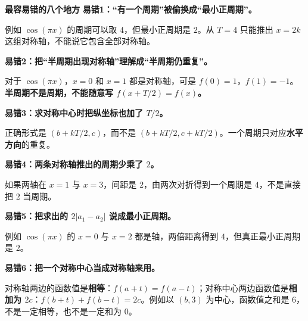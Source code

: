 \clearpage
\begin{trapbox}
\textbf{\textcolor{CTrap}{最容易错的八个地方}}
\textbf{\textcolor{CTrap}{易错1：“有一个周期”被偷换成“最小正周期”。}}



例如 $\cos(\pi x)$ 的周期可以取 $4$，但最小正周期是 $2$。从 $T=4$ 只能推出 $x=2k$ 这组对称轴，不能说它包含全部对称轴。



\end{trapbox}
\clearpage
\begin{trapbox}
\textbf{\textcolor{CTrap}{易错2：把“半周期出现对称轴”理解成“半周期仍重复”。}}



对于 $\cos(\pi x)$，$x=0$ 和 $x=1$ 都是对称轴，可是 $f(0)=1$，$f(1)=-1$。\textbf{半周期不是周期，不能随意写 $f(x+T/2)=f(x)$。}



\end{trapbox}
\clearpage
\begin{trapbox}
\textbf{\textcolor{CTrap}{易错3：求对称中心时把纵坐标也加了 $T/2$。}}



正确形式是 $(b+kT/2,c)$，而不是 $(b+kT/2,c+kT/2)$。一个周期只对应\textbf{水平方向}的重复。



\end{trapbox}
\clearpage
\begin{trapbox}
\textbf{\textcolor{CTrap}{易错4：两条对称轴推出的周期少乘了 $2$。}}



如果两轴在 $x=1$ 与 $x=3$，间距是 $2$，由两次对折得到一个周期是 $4$，不是直接把 $2$ 当周期。



\end{trapbox}
\clearpage
\begin{trapbox}
\textbf{\textcolor{CTrap}{易错5：把求出的 $2|a_1-a_2|$ 说成最小正周期。}}



例如 $\cos(\pi x)$ 的 $x=0$ 与 $x=2$ 都是轴，两倍距离得到 $4$，但真正最小正周期是 $2$。



\end{trapbox}
\clearpage
\begin{trapbox}
\textbf{\textcolor{CTrap}{易错6：把一个对称中心当成对称轴来用。}}



对称轴两边的函数值是\textbf{相等}：$f(a+t)=f(a-t)$；对称中心两边函数值是\textbf{相加为 $2c$}：$f(b+t)+f(b-t)=2c$。例如以 $(b,3)$ 为中心，函数值之和是 $6$，不是一定相等，也不是一定和为 $0$。



\end{trapbox}
